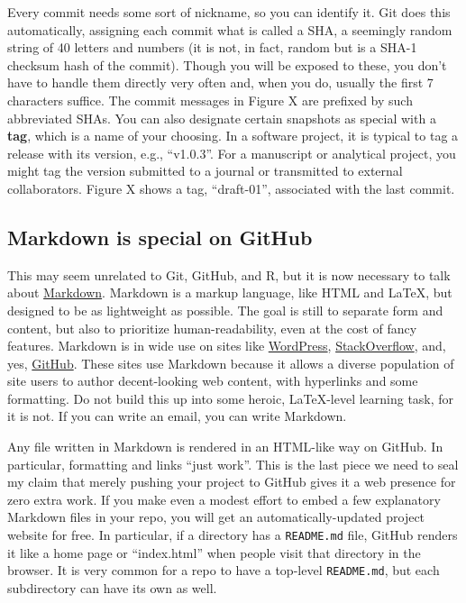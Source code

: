 \documentclass[12pt]{article}
\begin{document}
Every commit needs some sort of nickname, so you can identify it. Git
does this automatically, assigning each commit what is called a SHA, a
seemingly random string of 40 letters and numbers (it is not, in fact,
random but is a SHA-1 checksum hash of the commit). Though you will be
exposed to these, you don't have to handle them directly very often and,
when you do, usually the first 7 characters suffice. The commit messages
in Figure X are prefixed by such abbreviated SHAs. You can also
designate certain snapshots as special with a \textbf{tag}, which is a
name of your choosing. In a software project, it is typical to tag a
release with its version, e.g., ``v1.0.3''. For a manuscript or
analytical project, you might tag the version submitted to a journal or
transmitted to external collaborators. Figure X shows a tag,
``draft-01'', associated with the last commit.

\subsection{Markdown is special on
GitHub}\label{markdown-is-special-on-github}

This may seem unrelated to Git, GitHub, and R, but it is now necessary
to talk about
\href{https://daringfireball.net/projects/markdown/syntax}{Markdown}.
Markdown is a markup language, like HTML and LaTeX, but designed to be
as lightweight as possible. The goal is still to separate form and
content, but also to prioritize human-readability, even at the cost of
fancy features. Markdown is in wide use on sites like
\href{https://en.support.wordpress.com/markdown/}{WordPress},
\href{https://stackoverflow.com/editing-help}{StackOverflow}, and, yes,
\href{https://help.github.com/categories/writing-on-github/}{GitHub}.
These sites use Markdown because it allows a diverse population of site
users to author decent-looking web content, with hyperlinks and some
formatting. Do not build this up into some heroic, LaTeX-level learning
task, for it is not. If you can write an email, you can write Markdown.

Any file written in Markdown is rendered in an HTML-like way on GitHub.
In particular, formatting and links ``just work''. This is the last
piece we need to seal my claim that merely pushing your project to
GitHub gives it a web presence for zero extra work. If you make even a
modest effort to embed a few explanatory Markdown files in your repo,
you will get an automatically-updated project website for free. In
particular, if a directory has a \texttt{README.md} file, GitHub renders
it like a home page or ``index.html'' when people visit that directory
in the browser. It is very common for a repo to have a top-level
\texttt{README.md}, but each subdirectory can have its own as well.
\end{document}
